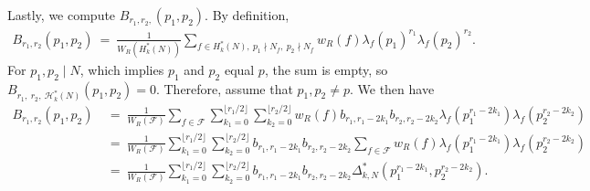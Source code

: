 \documentclass[11pt, reqno]{amsart}
\theoremstyle{definition}
\theoremstyle{remark}
\numberwithin{equation}{section}
\begin{document}
Lastly, we compute $B_{r_1, r_2,}(p_1, p_2)$.
By definition,
\begin{align}\label{B for N=p^2}
    B_{r_1,r_2}(p_1, p_2) \ = \ \frac{1}{W_R(H_k^*(N))}\sum_{f \in H_k^*(N),~p_1\nmid N_f,~p_2 \nmid N_f} w_R(f) \lambda_f(p_1)^{r_1}\lambda_f(p_2)^{r_2}.
\end{align}
For $p_1, p_2 \mid N$, which implies $p_1$ and $ p_2$ equal $p$, the sum is empty, so $B_{r_1,~r_2,~\mathcal{H}_k^*(N)}(p_1, p_2) = 0$. Therefore, assume that $p_1, p_2 \neq p$.
We then have
\begin{align}
   B_{r_1,r_2}(p_1, p_2)\ &=\ \frac{1}{W_R(\mathcal{F})}\sum_{f\in\mathcal{F}}\sum_{k_1=0}^{\lfloor r_1/2 \rfloor}\sum_{k_2=0}^{\lfloor r_2/2 \rfloor} w_R(f)b_{r_1, r_1-2k_1}b_{r_2, r_2-2k_2}\lambda_f\left(p_1^{r_1-2k_1}\right)\lambda_f\left(p_2^{r_2-2k_2}\right) \nonumber\\
    &=\ \frac{1}{W_R(\mathcal{F})}\sum_{k_1=0}^{\lfloor r_1/2 \rfloor}\sum_{k_2=0}^{\lfloor r_2/2 \rfloor} b_{r_1, r_1-2k_1}b_{r_2, r_2-2k_2}\sum_{f\in\mathcal{F}}w_R(f)\lambda_f\left(p_1^{r_1-2k_1}\right)\lambda_f\left(p_2^{r_2-2k_2}\right) \nonumber\\
    &=\ \label{B up to Delta*} \frac{1}{W_R(\mathcal{F})}\sum_{k_1=0}^{\lfloor r_1/2 \rfloor}\sum_{k_2=0}^{\lfloor r_2/2 \rfloor} b_{r_1, r_1-2k_1}b_{r_2, r_2-2k_2}\Delta^*_{k,N}\left(p_1^{r_1-2k_1}, p_2^{r_2-2k_2}\right).
\end{align}
\end{document}
